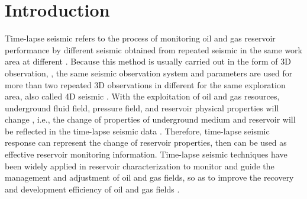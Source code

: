 \section{Introduction}
Time-lapse seismic refers to the process of monitoring oil and gas reservoir performance by different seismic  obtained from repeated seismic  in the same work area at different  . 
Because this method is usually carried out in the form of 3D observation, , the same seismic observation system and parameters are used for more than two repeated 3D observations in different  for the same exploration area,   also called 4D seismic  \cite[]{Tucker2000time}. 
With the exploitation of oil and gas resources, underground fluid field, pressure field,  and reservoir physical properties will change , i.e., the change of properties of underground medium and reservoir will be reflected in the time-lapse seismic data  \cite[]{hicks2016time-lapse}.
Therefore,  time-lapse seismic response can represent the change of reservoir properties, then can be used as  effective  reservoir monitoring information.  Time-lapse seismic techniques have been widely applied in reservoir characterization to monitor and guide the management and adjustment of oil and gas fields, so as to  improve the recovery and development efficiency of oil and gas fields  \cite[]{landro2001discrimination}. 

